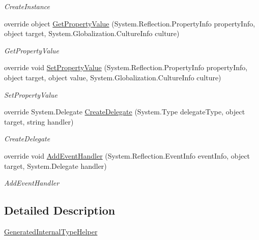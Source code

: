 \begin{DoxyCompactItemize}
\begin{DoxyCompactList}\small\item\em Create\+Instance \end{DoxyCompactList}\item 
override object \mbox{\hyperlink{class_xaml_generated_namespace_1_1_generated_internal_type_helper_afdc9fe15b56607d02082908d934480c6}{Get\+Property\+Value}} (System.\+Reflection.\+Property\+Info property\+Info, object target, System.\+Globalization.\+Culture\+Info culture)
\begin{DoxyCompactList}\small\item\em Get\+Property\+Value \end{DoxyCompactList}\item 
override void \mbox{\hyperlink{class_xaml_generated_namespace_1_1_generated_internal_type_helper_ade0f04c0f7b18dd5b170e071d5534d38}{Set\+Property\+Value}} (System.\+Reflection.\+Property\+Info property\+Info, object target, object value, System.\+Globalization.\+Culture\+Info culture)
\begin{DoxyCompactList}\small\item\em Set\+Property\+Value \end{DoxyCompactList}\item 
override System.\+Delegate \mbox{\hyperlink{class_xaml_generated_namespace_1_1_generated_internal_type_helper_a8ec4c37e82d9f4e867e9655f4eac3a78}{Create\+Delegate}} (System.\+Type delegate\+Type, object target, string handler)
\begin{DoxyCompactList}\small\item\em Create\+Delegate \end{DoxyCompactList}\item 
override void \mbox{\hyperlink{class_xaml_generated_namespace_1_1_generated_internal_type_helper_a73471f4a6d1ca4c4fceec9ad8610f0c8}{Add\+Event\+Handler}} (System.\+Reflection.\+Event\+Info event\+Info, object target, System.\+Delegate handler)
\begin{DoxyCompactList}\small\item\em Add\+Event\+Handler \end{DoxyCompactList}\end{DoxyCompactItemize}


\subsection{Detailed Description}
\mbox{\hyperlink{class_xaml_generated_namespace_1_1_generated_internal_type_helper}{Generated\+Internal\+Type\+Helper}} 



